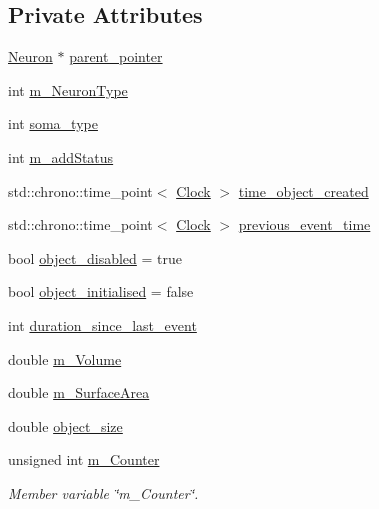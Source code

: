 \subsection*{Private Attributes}
\begin{DoxyCompactItemize}
\item 
\mbox{\hyperlink{classNeuron}{Neuron}} $\ast$ \mbox{\hyperlink{classSoma_a02223dabe7a45cebcdb79b6eb159d2a9}{parent\+\_\+pointer}}
\item 
int \mbox{\hyperlink{classSoma_aba619b25aef756c8361d0444efb31cf3}{m\+\_\+\+Neuron\+Type}}
\item 
int \mbox{\hyperlink{classSoma_ada423d58bc25a27df2a68adffb13718b}{soma\+\_\+type}}
\item 
int \mbox{\hyperlink{classSoma_ab9887343fb7e5575677e7a526d7e7a69}{m\+\_\+add\+Status}}
\item 
std\+::chrono\+::time\+\_\+point$<$ \mbox{\hyperlink{universe_8h_a0ef8d951d1ca5ab3cfaf7ab4c7a6fd80}{Clock}} $>$ \mbox{\hyperlink{classSoma_ac0e5b4b952e136b8a6c4c69f607ce4da}{time\+\_\+object\+\_\+created}}
\item 
std\+::chrono\+::time\+\_\+point$<$ \mbox{\hyperlink{universe_8h_a0ef8d951d1ca5ab3cfaf7ab4c7a6fd80}{Clock}} $>$ \mbox{\hyperlink{classSoma_ab6204961b77d4224199eec0b105e41dd}{previous\+\_\+event\+\_\+time}}
\item 
bool \mbox{\hyperlink{classSoma_af2b64c3b8490b302fcdd6461034271c0}{object\+\_\+disabled}} = true
\item 
bool \mbox{\hyperlink{classSoma_ab85b5a30283f03bb8ff202704bec08fe}{object\+\_\+initialised}} = false
\item 
int \mbox{\hyperlink{classSoma_ab5ada1db9da44a5aac9a7b40364fc1b8}{duration\+\_\+since\+\_\+last\+\_\+event}}
\item 
double \mbox{\hyperlink{classSoma_aa5c0b1a0db07052b76d2ccf4e7ef3e83}{m\+\_\+\+Volume}}
\item 
double \mbox{\hyperlink{classSoma_a66bfc792729e6f5d3827d57f2cf3780c}{m\+\_\+\+Surface\+Area}}
\item 
double \mbox{\hyperlink{classSoma_a803536eba7a6aecd3716cbdd32659fc4}{object\+\_\+size}}
\item 
unsigned int \mbox{\hyperlink{classSoma_a11f3e7371be45ce6d7a55eb19e98b006}{m\+\_\+\+Counter}}
\begin{DoxyCompactList}\small\item\em Member variable \char`\"{}m\+\_\+\+Counter\char`\"{}. \end{DoxyCompactList}\item 

\end{DoxyCompactItemize}

